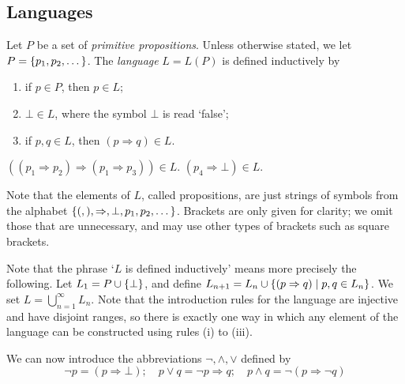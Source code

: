 \subsection{Languages}
Let \( P \) be a set of \emph{primitive propositions}.
Unless otherwise stated, we let \( P = \qty{p_1, p_2, \dots} \).
The \emph{language} \( L = L(P) \) is defined inductively by
\begin{enumerate}
    \item if \( p \in P \), then \( p \in L \);
    \item \( \bot \in L \), where the symbol \( \bot \) is read `false';
    \item if \( p, q \in L \), then \( (p \Rightarrow q) \in L \).
\end{enumerate}
\begin{example}
    \( ((p_1 \Rightarrow p_2) \Rightarrow (p_1 \Rightarrow p_3)) \in L \).
    \( (p_4 \Rightarrow \bot) \in L \).
\end{example}
\begin{remark}
    Note that the elements of \( L \), called propositions, are just strings of symbols from the alphabet \( \qty{(, ), \Rightarrow, \bot, p_1, p_2, \dots} \).
    Brackets are only given for clarity; we omit those that are unnecessary, and may use other types of brackets such as square brackets.

    Note that the phrase `\( L \) is defined inductively' means more precisely the following.
    Let \( L_1 = P \cup \qty{\bot} \), and define \( L_{n+1} = L_n \cup \qty{(p \Rightarrow q) \mid p, q \in L_n} \).
    We set \( L = \bigcup_{n=1}^\infty L_n \).
    Note that the introduction rules for the language are injective and have disjoint ranges, so there is exactly one way in which any element of the language can be constructed using rules (i) to (iii).
\end{remark}
We can now introduce the abbreviations \( \neg, \wedge, \vee \) defined by
\[ \neg p = (p \Rightarrow \bot);\quad p \vee q = \neg p \Rightarrow q;\quad p \wedge q = \neg (p \Rightarrow \neg q) \]

